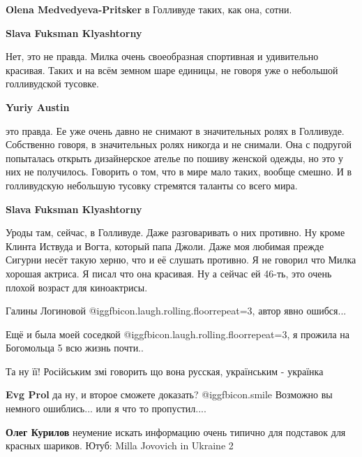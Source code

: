 \begin{itemize}
\begin{itemize} %
\textbf{Olena Medvedyeva-Pritsker} в Голливуде таких, как она, сотни.

\begin{itemize} %
\textbf{Slava Fuksman Klyashtorny} 

Нет, это не правда. Милка очень своеобразная спортивная и удивительно красивая.
Таких и на всём земном шаре единицы, не говоря уже о небольшой голливудской
тусовке.


\textbf{Yuriy Austin} 

это правда. Ее уже очень давно не снимают в значительных ролях в Голливуде.
Собственно говоря, в значительных ролях никогда и не снимали. Она с подругой
попыталась открыть дизайнерское ателье по пошиву женской одежды, но это у них
не получилось. Говорить о том, что в мире мало таких, вообще смешно. И в
голливудскую небольшую тусовку стремятся таланты со всего мира.


\textbf{Slava Fuksman Klyashtorny} 

Уроды там, сейчас, в Голливуде. Даже разговаривать о них противно. Ну кроме
Клинта Иствуда и Вогта, который папа Джоли. Даже моя любимая прежде Сигурни
несёт такую херню, что и её слушать противно. Я не говорил что Милка хорошая
актриса. Я писал что она красивая. Ну а сейчас ей 46-ть, это очень плохой
возраст для киноактрисы.

\end{itemize} %

\end{itemize} %


Галины Логиновой @igg{fbicon.laugh.rolling.floor}{repeat=3}, автор явно ошибся...


Ещё и была моей соседкой @igg{fbicon.laugh.rolling.floor}{repeat=3}, я прожила
на Богомольца 5 всю жизнь почти..

Та ну її! Російським змі говорить що вона русская, українським - українка

\begin{itemize} %
\textbf{Evg Prol} да ну, и второе сможете доказать?  @igg{fbicon.smile}
Возможно вы немного ошиблись... или я что то пропустил....

\begin{itemize} %
\textbf{Олег Курилов} неумение искать информацию очень типично для подставок для красных шариков. Ютуб: Milla Jovovich in Ukraine 2


\end{itemize}
\end{itemize}
\end{itemize}
